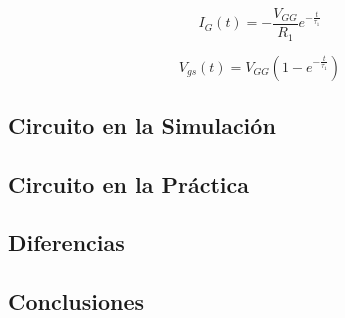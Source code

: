 \begin{equation}
I_G(t) = -\frac{V_{GG}}{R_1}e^{-\frac{t}{\tau_1}}
\label{eq:ej1:ig_ton}
\end{equation}

\begin{equation}
V_{gs}(t) = V_{GG}(1-e^{-\frac{t}{\tau_1}})
\label{eq:ej1:vgs_ton}
\end{equation}

\subsection{Circuito en la Simulación}

\subsection{Circuito en la Práctica}

\subsection{Diferencias}

\subsection{Conclusiones}

